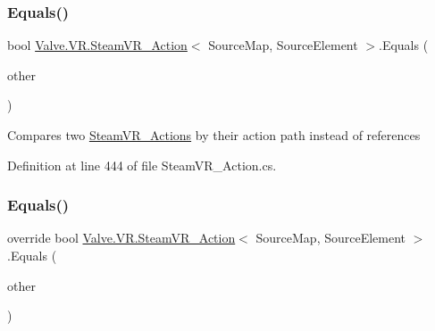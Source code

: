 \mbox{\label{class_valve_1_1_v_r_1_1_steam_v_r___action_a47cd704e2eab7d9ea4ac09fb257ba4cb}} 
\subsubsection{\texorpdfstring{Equals()}{Equals()}\hspace{0.1cm}{\footnotesize\ttfamily [1/2]}}
{\footnotesize\ttfamily bool \mbox{\hyperlink{class_valve_1_1_v_r_1_1_steam_v_r___action}{Valve.\+V\+R.\+Steam\+V\+R\+\_\+\+Action}}$<$ Source\+Map, Source\+Element $>$.Equals (\begin{DoxyParamCaption}\item[{\mbox{\hyperlink{class_valve_1_1_v_r_1_1_steam_v_r___action}{Steam\+V\+R\+\_\+\+Action}}$<$ Source\+Map, Source\+Element $>$}]{other }\end{DoxyParamCaption})}



Compares two \mbox{\hyperlink{class_valve_1_1_v_r_1_1_steam_v_r___actions}{Steam\+V\+R\+\_\+\+Actions}} by their action path instead of references 



Definition at line 444 of file Steam\+V\+R\+\_\+\+Action.\+cs.

\mbox{\label{class_valve_1_1_v_r_1_1_steam_v_r___action_ac09cc52154a6418bb9782117f519c3b5}} 
\subsubsection{\texorpdfstring{Equals()}{Equals()}\hspace{0.1cm}{\footnotesize\ttfamily [2/2]}}
{\footnotesize\ttfamily override bool \mbox{\hyperlink{class_valve_1_1_v_r_1_1_steam_v_r___action}{Valve.\+V\+R.\+Steam\+V\+R\+\_\+\+Action}}$<$ Source\+Map, Source\+Element $>$.Equals (\begin{DoxyParamCaption}\item[{object}]{other }\end{DoxyParamCaption})}



